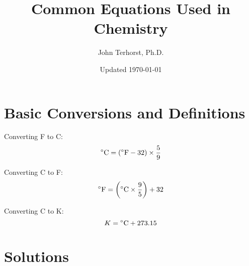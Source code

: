 \documentclass[10pt]{article}
\title{Common Equations Used in Chemistry}
\author{John Terhorst, Ph.D.}
\date{Updated \today}
\begin{document}
\begin{comment}

need to add:

- coulomb's law for energy 


\end{comment}

\maketitle
\tableofcontents


\newpage\section{Basic Conversions and Definitions}

Converting \deg F to \deg C:
\begin{equation*}
\textnormal{\deg C} = (\textnormal{\deg F}-32)\times \frac{5}{9}
\end{equation*}

Converting \deg C to \deg F:
\begin{equation*}
\textnormal{\deg F} = \left(\textnormal{\deg C}\times \frac{9}{5}\right) +32
\end{equation*}

Converting \deg C to K:
\begin{equation*}
K = \textnormal{\deg C}+273.15
\end{equation*}


\section{Solutions}
\end{document}
